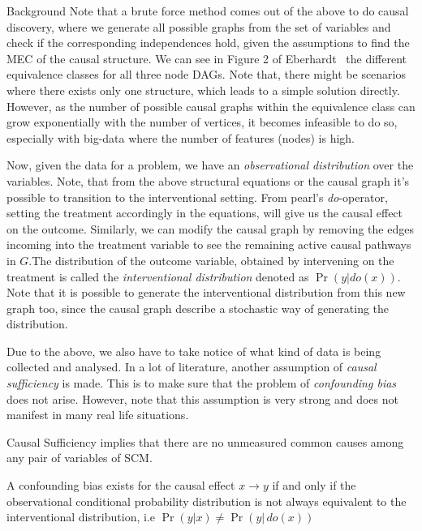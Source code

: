 \documentclass[10pt]{article}
\begin{document}
\begin{psection}[2]{Background}
    Note that a brute force method comes out of the above to do causal discovery, where
    we generate all possible graphs from the set of variables and check if the
    corresponding independences hold, given the assumptions to find the MEC of the
    causal structure. We can see in Figure 2 of
    Eberhardt~\cite{eberhardt2017introduction} the different equivalence classes for all
    three node DAGs. Note that, there might be scenarios where there exists only one
    structure, which leads to a simple solution directly. However, as the number of
    possible causal graphs within the equivalence class can grow exponentially with the
    number of vertices, it becomes infeasible to do so, especially with big-data where
    the number of features (nodes) is high. 
    
    Now, given the data for a problem, we have an \textit{observational distribution}
    over the variables. Note, that from the above structural equations or the causal
    graph it's possible to transition to the interventional setting. From pearl's
    \textit{do}-operator, setting the treatment accordingly in the equations, will give
    us the causal effect on the outcome. Similarly, we can modify the causal graph by
    removing the edges incoming into the treatment variable to see the remaining active
    causal pathways in $G$.The distribution of the  outcome variable, obtained by
    intervening on the treatment is called the \textit{interventional distribution}
    denoted as $\Pr({y \vert do(x)})$. Note that it is possible to generate the
    interventional distribution from this new graph too, since the causal graph describe
    a stochastic way of generating the distribution.

    Due to the above, we also have to take notice of what kind of data is being
    collected and analysed. In a lot of literature, another assumption of \textit{causal
    sufficiency} is made. This is to make sure that the problem of \textit{confounding
    bias} does not arise. However, note that this assumption is very strong and does not
    manifest in many real life situations. 
    \begin{definition}
        Causal Sufficiency implies that there are no unmeasured common causes among any
        pair of variables of SCM.%
    \end{definition}

    \begin{definition}
        A confounding bias exists for the causal effect $x \rightarrow y$ if and only if
        the observational conditional probability distribution is not always equivalent
        to the interventional distribution, i.e $\Pr{(y \vert x)} \neq \Pr{(y \vert \,
        do(x))}$
    \end{definition}


\end{psection}
\end{document}
